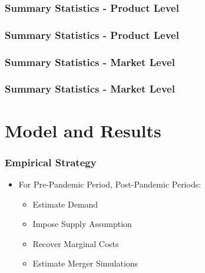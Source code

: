\documentclass[xcolor=dvipsnames]{beamer}
\begin{document}
      \begin{frame}
        \frametitle{Summary Statistics - Product Level}
                \begin{adjustbox}{max height=\dimexpr\textheight-5.5cm\relax,
           max width=\textwidth}

\end{adjustbox}
    \end{frame}

    \begin{frame}
        \frametitle{Summary Statistics - Product Level}
                \begin{adjustbox}{max height=\dimexpr\textheight-5.5cm\relax,
           max width=\textwidth}

\end{adjustbox}
    \end{frame}

    \begin{frame}
        \frametitle{Summary Statistics - Market Level}
       \tiny
        \centering
        \begin{adjustbox}{max height=\dimexpr\textheight-5.5cm\relax,
           max width=\textwidth}

\end{adjustbox}
    \end{frame}

     \begin{frame}
        \frametitle{Summary Statistics - Market Level}
       \tiny
        \centering
        \begin{adjustbox}{max height=\dimexpr\textheight-5.5cm\relax,
           max width=\textwidth}

\end{adjustbox}
    \end{frame}

    \section{Model and Results}

    \begin{frame}
        \frametitle{Empirical Strategy}
        \begin{itemize}
            \item For Pre-Pandemic Period, Post-Pandemic Periods:
            \begin{itemize}
                \item Estimate Demand
                \item Impose Supply Assumption
                \item Recover Marginal Costs
                \item Estimate Merger Simulations
            \end{itemize}
        \end{itemize}
    \end{frame}
    
\end{document}

